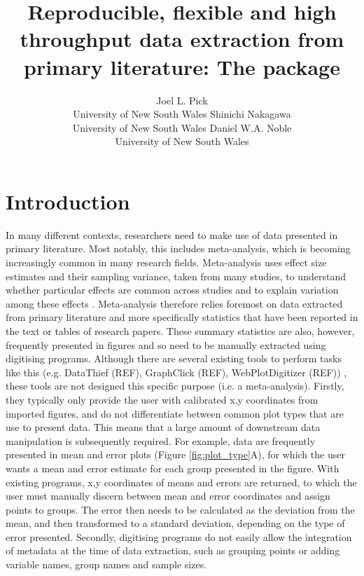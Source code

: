 \documentclass[article]{jss}
\author{Joel L. Pick\\University of New South Wales
   \And Shinichi Nakagawa\\University of New South Wales
   \AND Daniel W.A. Noble\\University of New South Wales
   }
\title{Reproducible, flexible and high throughput data extraction from primary literature: The \pkg{metaDigitise} \proglang{R} package}
\begin{document}



\section{Introduction}

In many different contexts, researchers need to make use of data presented in primary literature. Most notably, this includes meta-analysis, which is becoming increasingly common in many research fields. Meta-analysis uses effect size estimates and their sampling variance, taken from many studies, to understand whether particular effects are common across studies and to explain variation among these effects \citep{Naka2017, Glass1976, Koricheva2013, Borenstein2009}. Meta-analysis therefore relies foremost on data extracted from primary literature and more specifically statistics that have been reported in the text or tables of research papers. These summary statistics are also, however, frequently presented in figures and so need to be manually extracted using digitising programs. Although there are several existing tools to perform tasks like this (e.g. DataThief (REF), GraphClick (REF), WebPlotDigitizer (REF))
, these tools are not designed this specific purpose (i.e. a meta-analysis). 
Firstly, they typically only provide the user with calibrated x,y coordinates from imported figures, and do not differentiate between common plot types that are use to present data. This means that a large amount of downstream data manipulation is subsequently required. For example, data are frequently presented in mean and error plots (Figure \ref{fig:plot_type}A), for which the user wants a mean and error estimate for each group presented in the figure. With existing programs, x,y coordinates of means and errors are returned, to which the user must manually discern between mean and error coordinates and assign points to groups. The error then needs to be calculated as the deviation from the mean, and then transformed to a standard deviation, depending on the type of error presented.
Secondly, digitising programs do not easily allow the integration of metadata at the time of data extraction, such as  grouping points or adding variable names, group names and sample sizes.
\end{document}
